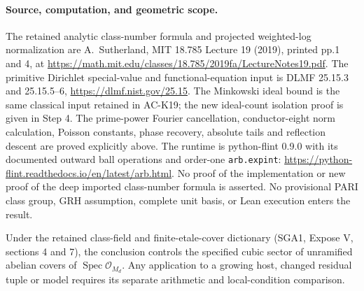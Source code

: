 \paragraph{Source, computation, and geometric scope.}
The retained analytic class-number formula and projected weighted-log
normalization are A.~Sutherland, MIT 18.785 Lecture 19 (2019), printed
pp.1 and 4, at
\url{https://math.mit.edu/classes/18.785/2019fa/LectureNotes19.pdf}.
The primitive Dirichlet special-value and functional-equation input
is DLMF 25.15.3 and 25.15.5--6, \url{https://dlmf.nist.gov/25.15}.
The Minkowski ideal bound is the same classical input retained in
AC-K19; the new ideal-count isolation proof is given in Step 4.
The prime-power Fourier cancellation, conductor-eight norm calculation,
Poisson constants, phase recovery, absolute tails and reflection
descent are proved explicitly above.
The runtime is python-flint 0.9.0 with its documented outward ball
operations and order-one \texttt{arb.expint}:
\url{https://python-flint.readthedocs.io/en/latest/arb.html}.
No proof of the implementation or new proof of the deep imported
class-number formula is asserted.  No provisional PARI class group,
GRH assumption, complete unit basis, or Lean execution enters the result.

Under the retained class-field and finite-etale-cover dictionary
(SGA1, Expose V, sections 4 and 7), the conclusion controls the
specified cubic sector of unramified abelian covers of
$\operatorname{Spec}\mathcal O_{M_d}$.
Any application to a growing host, changed residual tuple or model
requires its separate arithmetic and local-condition comparison.
